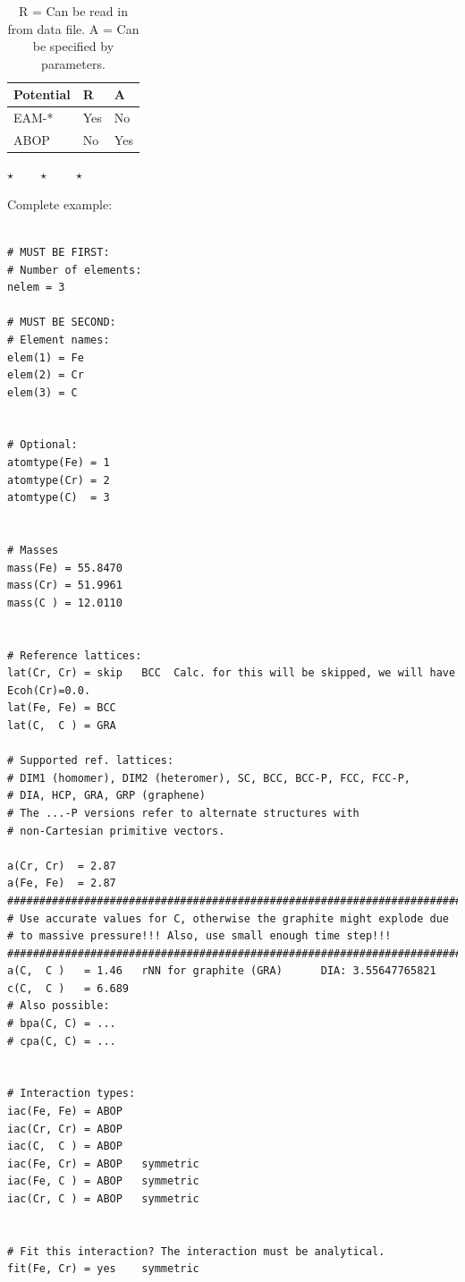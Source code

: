 \documentclass[a4paper,12pt,pdftex,onecolumn]{article}
\newcommand{\stars}{\begin{center}%
\vspace{1em plus 0.5em minus 0.5em}%
$\star \qquad \star \qquad \star$%
\vspace{1em plus 0.5em minus 0.5em}%
\end{center}}
\begin{document}
\begin{table}[!h]
\caption{
R = Can be read in from data file.
A = Can be specified by parameters.
\label{tab:pot-da}
}
\begin{center}
\begin{tabular}{|l|l|l|}
\hline
\hline
Potential   & R    & A  \\
\hline
EAM-*       & Yes  & No \\
ABOP        & No   & Yes \\
\hline
\hline
\end{tabular}
\end{center}
\end{table}

\stars


Complete example:


\begin{Verbatim}[fontsize=\relsize{-1},frame=single]

# MUST BE FIRST:
# Number of elements:
nelem = 3

# MUST BE SECOND:
# Element names:
elem(1) = Fe
elem(2) = Cr
elem(3) = C


# Optional:
atomtype(Fe) = 1
atomtype(Cr) = 2
atomtype(C)  = 3


# Masses
mass(Fe) = 55.8470
mass(Cr) = 51.9961
mass(C ) = 12.0110


# Reference lattices:
lat(Cr, Cr) = skip   BCC  Calc. for this will be skipped, we will have Ecoh(Cr)=0.0.
lat(Fe, Fe) = BCC
lat(C,  C ) = GRA

# Supported ref. lattices:
# DIM1 (homomer), DIM2 (heteromer), SC, BCC, BCC-P, FCC, FCC-P,
# DIA, HCP, GRA, GRP (graphene)
# The ...-P versions refer to alternate structures with
# non-Cartesian primitive vectors.

a(Cr, Cr)  = 2.87
a(Fe, Fe)  = 2.87
#########################################################################
# Use accurate values for C, otherwise the graphite might explode due
# to massive pressure!!! Also, use small enough time step!!!
#########################################################################
a(C,  C )   = 1.46   rNN for graphite (GRA)      DIA: 3.55647765821
c(C,  C )   = 6.689
# Also possible:
# bpa(C, C) = ...
# cpa(C, C) = ...


# Interaction types:
iac(Fe, Fe) = ABOP
iac(Cr, Cr) = ABOP
iac(C,  C ) = ABOP
iac(Fe, Cr) = ABOP   symmetric
iac(Fe, C ) = ABOP   symmetric
iac(Cr, C ) = ABOP   symmetric


# Fit this interaction? The interaction must be analytical.
fit(Fe, Cr) = yes    symmetric



\end{Verbatim}
\end{document}
